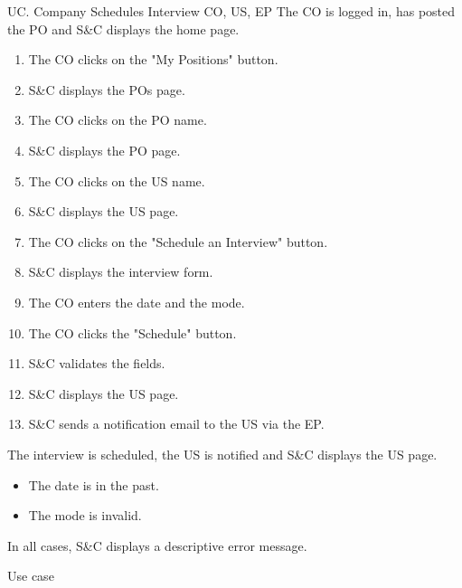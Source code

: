 \clearpage
\begin{usecase}
    {UC\theuc. Company Schedules Interview}
    {CO, US, EP}
    {The CO is logged in, has posted the PO and S\&C displays the home page.}
    {\begin{enumerate}[leftmargin=*]
        \item The CO clicks on the "My Positions" button.
        \item S\&C displays the POs page.
        \item The CO clicks on the PO name.
        \item S\&C displays the PO page.
        \item The CO clicks on the US name.
        \item S\&C displays the US page.
        \item The CO clicks on the "Schedule an Interview" button.
        \item S\&C displays the interview form.
        \item The CO enters the date and the mode.
        \item The CO clicks the "Schedule" button.
        \item S\&C validates the fields.
        \item S\&C displays the US page.
        \item S\&C sends a notification email to the US via the EP.
    \end{enumerate}}
    {The interview is scheduled, the US is notified and S\&C displays the US page.}
    {\begin{itemize}[leftmargin=*, label=\tiny\textbullet]
        \item The date is in the past.
        \item The mode is invalid.
    \end{itemize}
    In all cases, S\&C displays a descriptive error message.}
    {Use case \theuc}
\end{usecase}

